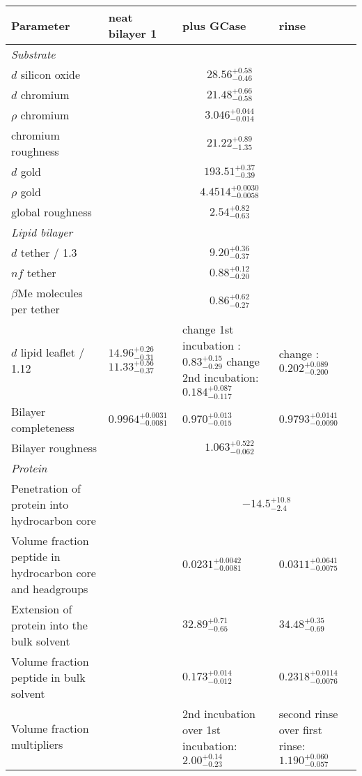 \documentclass[11pt]{article}
\begin{document}
\renewcommand{\arraystretch}{1.1}

\begin{tabular}[t]{|p{3.5cm}|p{2.6cm}|p{2.6cm}|p{2.6cm}|} \hline
\bf{Parameter} & \bf{neat bilayer 1} & \bf{plus GCase} & \bf{rinse} \\ \hline
\multicolumn{4}{|l|}{\textit{Substrate}} \\ \hline
$d$ silicon oxide &\multicolumn{3}{|c|}{ $28.56_{-0.46}^{+0.58}$ } \\ \hline
$d$ chromium &\multicolumn{3}{|c|}{ $21.48_{-0.58}^{+0.66}$ } \\ \hline
$\rho$ chromium &\multicolumn{3}{|c|}{ $3.046_{-0.014}^{+0.044}$ } \\ \hline
chromium roughness &\multicolumn{3}{|c|}{ $21.22_{-1.35}^{+0.89}$ } \\ \hline
$d$ gold &\multicolumn{3}{|c|}{ $193.51_{-0.39}^{+0.37}$ } \\ \hline
$\rho$ gold &\multicolumn{3}{|c|}{ $4.4514_{-0.0058}^{+0.0030}$ } \\ \hline
global roughness &\multicolumn{3}{|c|}{ $2.54_{-0.63}^{+0.82}$ } \\ \hline

\multicolumn{4}{|l|}{\textit{Lipid bilayer}} \\ \hline
$d$ tether / 1.3 &\multicolumn{3}{|c|}{ $9.20_{-0.37}^{+0.36}$ } \\ \hline
$nf$ tether &\multicolumn{3}{|c|}{ $0.88_{-0.20}^{+0.12}$ } \\ \hline
$\beta$Me molecules per tether &\multicolumn{3}{|c|}{ $0.86_{-0.27}^{+0.62}$ } \\ \hline
$d$ lipid leaflet / 1.12 & $14.96_{-0.31}^{+0.26}$ $11.33_{-0.37}^{+0.56}$ & change 1st incubation : $0.83_{-0.29}^{+0.15}$ change 2nd incubation: $0.184_{-0.117}^{+0.087}$ & change : $0.202_{-0.200}^{+0.089}$ \\ \hline
Bilayer completeness & $0.9964_{-0.0081}^{+0.0031}$ & $0.970_{-0.015}^{+0.013}$ & $0.9793_{-0.0090}^{+0.0141}$ \\ \hline
Bilayer roughness &\multicolumn{3}{|c|}{ $1.063_{-0.062}^{+0.522}$ } \\ \hline

\multicolumn{4}{|l|}{\textit{Protein}} \\ \hline
Penetration of protein into hydrocarbon core & & \multicolumn{2}{|c|}{ $-14.5_{-2.4}^{+10.8}$ } \\ \hline
Volume fraction peptide in hydrocarbon core and headgroups& & $0.0231_{-0.0081}^{+0.0042}$ & $0.0311_{-0.0075}^{+0.0641}$ \\ \hline
Extension of protein into the bulk solvent & & $32.89_{-0.65}^{+0.71}$ & $34.48_{-0.69}^{+0.35}$ \\ \hline
Volume fraction peptide in bulk solvent & & $0.173_{-0.012}^{+0.014}$ & $0.2318_{-0.0076}^{+0.0114}$ \\ \hline
Volume fraction multipliers & & 2nd incubation over 1st incubation: $2.00_{-0.23}^{+0.14}$ & second rinse over first rinse: $1.190_{-0.057}^{+0.060}$ \\ \hline
\end{tabular}
\end{document}
